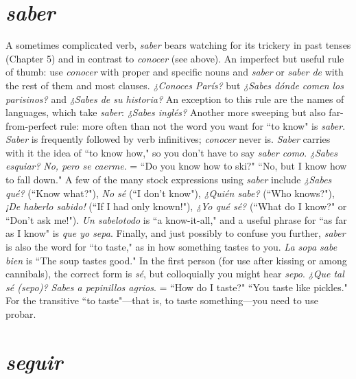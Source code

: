 \section{\emph{saber}}

A sometimes complicated verb, \emph{saber} bears watching for its
trickery in past tenses (Chapter 5) and in contrast to \emph{conocer} (see
above). An imperfect but useful rule of thumb: use \emph{conocer} with
proper and specific nouns and \emph{saber} or \emph{saber de} with the rest of them
and most clauses. \emph{¿Conoces París?} but \emph{¿Sabes dónde comen los parisinos?} and \emph{¿Sabes de su historia?} An exception to this rule are the
names of languages, which take \emph{saber}: \emph{¿Sabes inglés?} Another more
sweeping but also far-from-perfect rule: more often than not the word
you want for ``to know" is \emph{saber}. \emph{Saber} is frequently followed by verb
infinitives; \emph{conocer} never is. \emph{Saber} carries with it the idea of ``to know
how," so you don't have to say \emph{saber como}. \emph{¿Sabes esquiar?} \emph{No, pero
se caerme}. = ``Do you know how to ski?" ``No, but I know how to
fall down."
A few of the many stock expressions using \emph{saber} include
\emph{¿Sabes qué?} (``Know what?"), \emph{No sé} (``I don't know"), \emph{¿Quién sabe?}
(``Who knows?"), \emph{¡De haberlo sabido!} (``If I had only known!"), \emph{¿Yo
qué sé?} (``What do I know?" or ``Don't ask me!"). \emph{Un sabelotodo} is ``a
know-it-all," and a useful phrase for ``as far as I know" is \emph{que yo sepa}.
Finally, and just possibly to confuse you further, \emph{saber} is also
the word for ``to taste," as in how something tastes to you. \emph{La sopa
sabe bien} is ``The soup tastes good." In the first person (for use after
kissing or among cannibals), the correct form is \emph{sé}, but colloquially
you might hear \emph{sepo}. \emph{¿Que tal sé (sepo)? Sabes a pepinillos agrios}.
= ``How do I taste?" ``You taste like pickles." For the transitive ``to
taste"---that is, to taste something---you need to use probar.

\section{\emph{seguir}}

